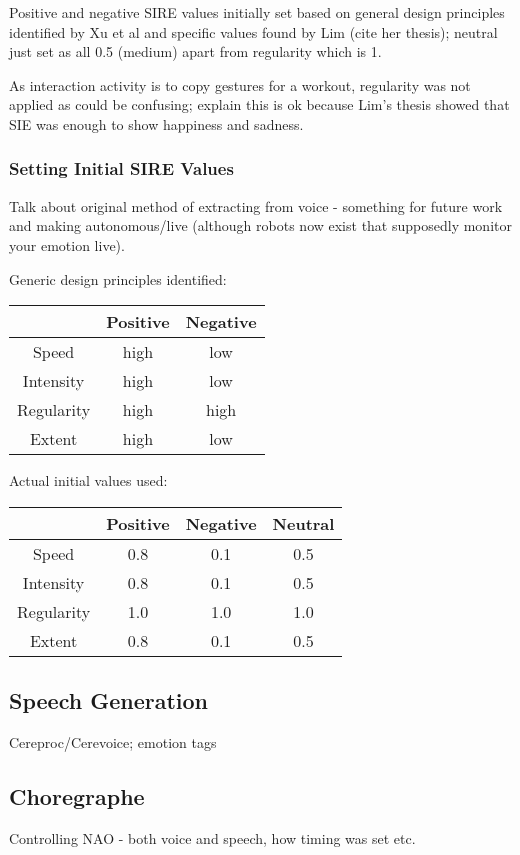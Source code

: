 \documentclass[11pt,a4paper]{report}
\begin{document}
Positive and negative SIRE values initially set based on general design principles identified by Xu et al \cite{xu2013mood} and specific values found by Lim (cite her thesis); neutral just set as all 0.5 (medium) apart from regularity which is 1.

As interaction activity is to copy gestures for a workout, regularity was not applied as could be confusing; explain this is ok because Lim's thesis showed that SIE was enough to show happiness and sadness. 

\subsubsection{Setting Initial SIRE Values}
Talk about original method of extracting from voice - something for future work and making autonomous/live (although robots now exist that supposedly monitor your emotion live).

Generic design principles identified:

\begin{tabular}{|c|c|c|}
\hline & Positive & Negative \\ 
\hline Speed & high & low \\ 
\hline Intensity & high & low \\ 
\hline Regularity & high & high \\ 
\hline Extent & high & low \\ 
\hline 
\end{tabular} 

Actual initial values used:

\begin{tabular}{|c|c|c|c|}
\hline & Positive & Negative & Neutral \\ 
\hline Speed & 0.8 & 0.1 & 0.5\\ 
\hline Intensity & 0.8 & 0.1 & 0.5 \\ 
\hline Regularity & 1.0 & 1.0 & 1.0 \\ 
\hline Extent & 0.8 & 0.1 & 0.5\\ 
\hline 
\end{tabular} 

\subsection{Speech Generation}
Cereproc/Cerevoice; emotion tags

\subsection{Choregraphe}
Controlling NAO - both voice and speech, how timing was set etc.
\end{document}
